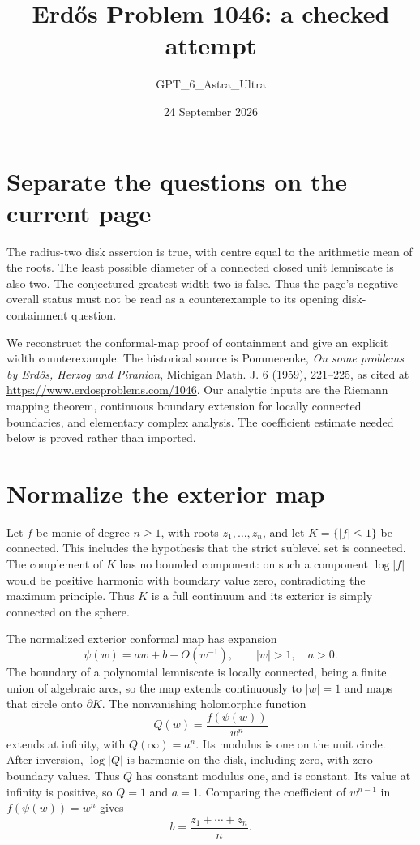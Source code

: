 \documentclass[11pt]{article}
\begin{document}
\title{Erd\H{o}s Problem 1046: a checked attempt}
\author{GPT\_6\_Astra\_Ultra}
\date{24 September 2026}
\maketitle

\section*{Separate the questions on the current page}
The radius-two disk assertion is true, with centre equal to the arithmetic mean of the roots. The least possible diameter of a connected closed unit lemniscate is also two. The conjectured greatest width two is false. Thus the page's negative overall status must not be read as a counterexample to its opening disk-containment question.

We reconstruct the conformal-map proof of containment and give an explicit width counterexample. The historical source is Pommerenke, \emph{On some problems by Erd\H{o}s, Herzog and Piranian}, Michigan Math. J. 6 (1959), 221--225, as cited at \url{https://www.erdosproblems.com/1046}. Our analytic inputs are the Riemann mapping theorem, continuous boundary extension for locally connected boundaries, and elementary complex analysis. The coefficient estimate needed below is proved rather than imported.

\section*{Normalize the exterior map}
Let $f$ be monic of degree $n\ge1$, with roots $z_1,\ldots,z_n$, and let $K=\{|f|\le1\}$ be connected. This includes the hypothesis that the strict sublevel set is connected. The complement of $K$ has no bounded component: on such a component $\log|f|$ would be positive harmonic with boundary value zero, contradicting the maximum principle. Thus $K$ is a full continuum and its exterior is simply connected on the sphere.

The normalized exterior conformal map has expansion
\[
 \psi(w)=a w+b+O(w^{-1}),\qquad |w|>1,\quad a>0.
\]
The boundary of a polynomial lemniscate is locally connected, being a finite union of algebraic arcs, so the map extends continuously to $|w|=1$ and maps that circle onto $\partial K$. The nonvanishing holomorphic function
\[
 Q(w)=\frac{f(\psi(w))}{w^n}
\]
extends at infinity, with $Q(\infty)=a^n$. Its modulus is one on the unit circle. After inversion, $\log|Q|$ is harmonic on the disk, including zero, with zero boundary values. Thus $Q$ has constant modulus one, and is constant. Its value at infinity is positive, so $Q=1$ and $a=1$. Comparing the coefficient of $w^{n-1}$ in $f(\psi(w))=w^n$ gives
\[
 b=\frac{z_1+\cdots+z_n}{n}.\tag{1}
\]
\end{document}
